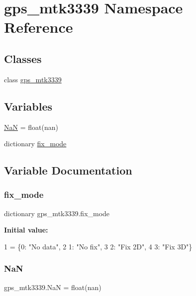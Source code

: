 \hypertarget{namespacegps__mtk3339}{}\section{gps\+\_\+mtk3339 Namespace Reference}
\label{namespacegps__mtk3339}
\subsection*{Classes}
\begin{DoxyCompactItemize}
\item 
class \hyperlink{classgps__mtk3339_1_1gps__mtk3339}{gps\+\_\+mtk3339}
\end{DoxyCompactItemize}
\subsection*{Variables}
\begin{DoxyCompactItemize}
\item 
\hyperlink{namespacegps__mtk3339_a2c2b1244bdabb964cba499040c9156cb}{NaN} = float(\textquotesingle{}nan\textquotesingle{})
\item 
dictionary \hyperlink{namespacegps__mtk3339_a41b2520ba7dd19da1e68140283678179}{fix\+\_\+mode}
\end{DoxyCompactItemize}


\subsection{Variable Documentation}
\mbox{\label{namespacegps__mtk3339_a41b2520ba7dd19da1e68140283678179}} 
\subsubsection{\texorpdfstring{fix\+\_\+mode}{fix\_mode}}
{\footnotesize\ttfamily dictionary gps\+\_\+mtk3339.\+fix\+\_\+mode}

{\bfseries Initial value\+:}
\begin{DoxyCode}
1 =  \{0: \textcolor{stringliteral}{"No data"},
2             1: \textcolor{stringliteral}{"No fix"},
3             2: \textcolor{stringliteral}{"Fix 2D"},
4             3: \textcolor{stringliteral}{"Fix 3D"}\}
\end{DoxyCode}
\mbox{\label{namespacegps__mtk3339_a2c2b1244bdabb964cba499040c9156cb}} 
\subsubsection{\texorpdfstring{NaN}{NaN}}
{\footnotesize\ttfamily gps\+\_\+mtk3339.\+NaN = float(\textquotesingle{}nan\textquotesingle{})}

